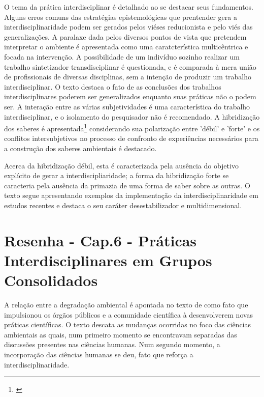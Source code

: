 \documentclass[
   article,       %
   12pt,          %
   oneside,       %
   a4paper,       %
   english,       %
   brazil,           %
   sumario=tradicional
   ]{abntex2}
\begin{document}
O tema da prática interdisciplinar é detalhado ao se destacar seus fundamentos. Alguns erros comuns das estratégias epistemológicas que prentender gera a interdisciplinaridade podem ser gerados pelos viéses reducionista e pelo viés das generalizações. A paralaxe  dada pelos diversos pontos de vista que pretendem interpretar o ambiente é apresentada como uma caratcterística multicêntrica e focada na intervenção. A possibilidade de um indivíduo sozinho realizar um trabalho sintetizador transdisciplinar é questionada, e é comparada à mera união de profissionais de diversas disciplinas, sem a intenção de produzir um trabalho interdisciplinar. O texto destaca o fato de as conclusões dos trabalhos interdisciplinares poderem ser generalizados enquanto suas práticas não o podem ser. A interação entre as várias subjetividades é uma característica do trabalho interdisciplinar, e o isolamento do pesquisador não é recomendado. A hibridização dos saberes é apresentada\footnote{\cite[p.102]{Marcos_Conceituais_Interdisciplinaridade}} considerando sua polarização entre 'débil' e 'forte' e os conflitos intersubjetivos no processo de confronto de experiências necessários para a construção dos saberes ambientais é destacado.

Acerca da hibridização débil, esta é caracterizada pela ausência do objetivo explícito de gerar a interdiscipliaridade; a forma da hibridização forte se caracteria pela ausência da primazia de uma forma de saber sobre as outras. O texto segue apresentando exemplos da implementação da interdisciplinaridade em estudos recentes e destaca o seu caráter desestabilizador e multidimensional.



\newpage

\section{Resenha - Cap.6 - Práticas Interdisciplinares em Grupos Consolidados}

A relação entre a degradação ambiental é apontada no texto de \cite{Interdisciplinares_Consolidados} como fato que impulsionou os órgãos públicos e a comunidade científica à desenvolverem novas práticas científicas. O texto descata as mudanças ocorridas no foco das ciências ambientais as quais, num primeiro momento se encontravam separadas das discussões presentes nas ciências humanas. Num segundo momento, a incorporação das ciências humanas se deu, fato que reforça a interdisciplinaridade. 
\end{document}
